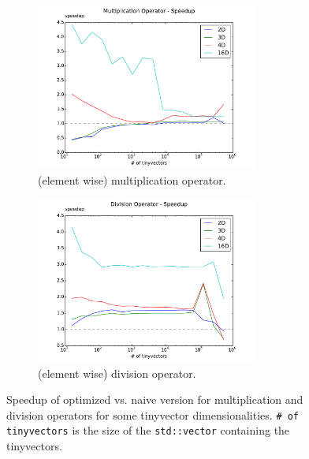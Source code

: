 \documentclass[a4paper]{scrartcl}
\begin{document}
\begin{figure}
    \centering
    \begin{subfigure}{\textwidth}
        \includegraphics[width=0.8\textwidth]{results/su_multiply.pdf}
        \caption{(element wise) multiplication operator.}
        \label{fig:su-mu}
    \end{subfigure}

    \begin{subfigure}{\textwidth}
        \includegraphics[width=0.8\textwidth]{results/su_divide.pdf}
        \caption{(element wise) division operator.}
        \label{fig:su-di}
    \end{subfigure}
    \caption{Speedup of optimized vs. naive version for multiplication and division operators for some tinyvector dimensionalities. \texttt{\# of tinyvectors} is the size of the \texttt{std::vector} containing the tinyvectors.}
\end{figure}
\end{document}

